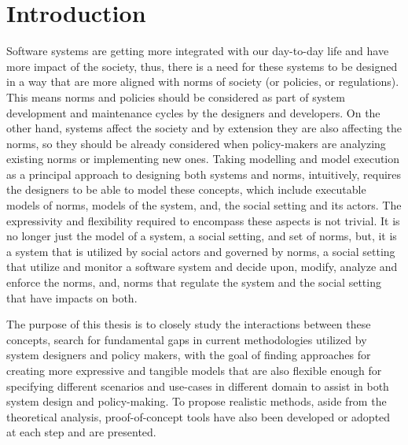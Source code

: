 \chapter{Introduction}
Software systems are getting more integrated with our day-to-day life and have more impact of the society, thus, there is a need for these systems to be designed in a way that are more aligned with norms of society (or policies, or regulations)\cite{Something}. This means norms and policies should be considered as part of system development and maintenance cycles by the designers and developers. On the other hand, systems affect the society and by extension they are also affecting the norms, so they should be already considered when policy-makers are analyzing existing norms or implementing new ones. Taking modelling and model execution as a principal approach to designing both systems and norms, intuitively, requires the designers to be able to model these concepts, which include executable models of norms, models of the system, and, the social setting and its actors. The expressivity and flexibility required to encompass these aspects is not trivial. It is no longer just the model of a system, a social setting, and set of norms, but, it is a system that is utilized by social actors and governed by norms, a social setting that utilize and monitor a software system and decide upon, modify, analyze and enforce the norms, and, norms that regulate the system and the social setting that have impacts on both. 


The purpose of this thesis is to closely study the interactions between these concepts, search for fundamental gaps in current methodologies utilized by system designers and policy makers, with the goal of finding approaches for creating more expressive and tangible models that are also flexible enough for specifying different scenarios and use-cases in different domain to assist in both system design and policy-making. To propose realistic methods, aside from the theoretical analysis, proof-of-concept tools have also been developed or adopted at each step and are presented.


